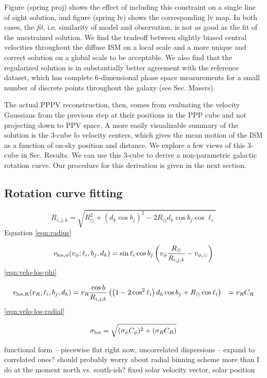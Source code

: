 Figure (spring proj) shows the effect of including this constraint on a single line of sight solution, and figure (spring lv) shows the corresponding lv map. In both cases, the \emph{fit}, i.e. similarity of model and observation, is not as good as the fit of the uncstrained solution. We find the tradeoff between slightly biased central velocities throughout the diffuse ISM on a local scale and a more unique and correct solution on a global scale to be acceptable. We also find that the regularized solution is in substantially better agreement with the reference dataset, which has complete 6-dimensional phase space measurements for a small number of discrete points throughout the galaxy (see Sec. Masers). 

The actual PPPV reconstruction, then, comes from evaluating the velocity Gaussians from the previous step at their positions in the PPP cube and not projecting down to PPV space. A more easily visualizable summary of the solution is the 3-cube fo velocity centers, which gives the mean motion of the ISM as a function of on-sky position and distance. We explore a few views of this 3-cube in Sec. Results. We can use this 3-cube to derive a non-parametric galactic rotation curve. Our procedure for this derivation is given in the next section. 

\subsection{Rotation curve fitting}
\begin{equation}
\label{eqn:radius}
    R_{i,j,k} = \sqrt{ R_\odot^2 + (d_k \cos b_j)^2 - 2 R_\odot d_k \cos b_j \cos \ell_i}
\end{equation}
Equation \ref{eqn:radius}

\begin{equation}
\label{eqn:velo-los-phi}
    v_{\rm{los}, \phi}(v_\phi; \ell_i, b_j, d_k) = \sin \ell_i \cos b_j  \left( v_\phi \frac{R_\odot}{R_{i,j,k}} - v_{\phi, \odot} \right)
\end{equation}
\ref{eqn:velo-los-phi}

\begin{align}
\label{eqn:velo-los-radial}
    v_{\rm{los}, R} (v_R; \ell_i,  b_j, d_k) &= v_R \frac{\cos b}{R_{i,j,k}} \left( \left( 1 - 2 \cos^2 \ell_i \right) d_k \cos b_j + R_\odot \cos \ell_i \right)
    &= v_R C_R
\end{align}
\ref{eqn:velo-los-radial}

\begin{equation}
\label{eqn:velo-los-dispersion}
    \sigma_{\rm{los}} = \sqrt{ 
        (\sigma_\phi C_\phi)^2 + (\sigma_R C_R)
    }
\end{equation}

functional form -- piecewise flat 
right now, uncorrelated dispersions -- expand to correlated ones?
should probably worry about radial binning scheme more than I do at the moment
north vs. south-ish?
fixed solar velocity vector, solar position